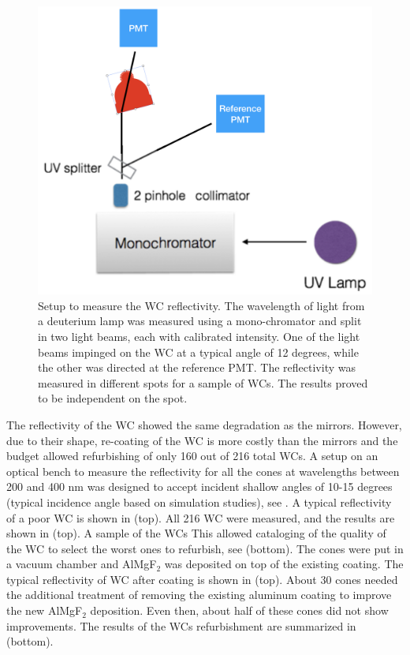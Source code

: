 \begin{figure}
	\centering
	\includegraphics[width=0.95\columnwidth,keepaspectratio]{img/wcSetup.png}
	\caption{Setup to measure the WC reflectivity. The wavelength of light from a deuterium lamp was measured using a mono-chromator and split in two
            light beams, each with calibrated intensity. One of the light beams impinged on the WC at a typical angle of 12 degrees,
            while the other was directed at the reference PMT. The reflectivity was measured in different spots for a sample of WCs.  The results proved
            to be independent on the spot. }
	\label{fig:wcSetup}
\end{figure}

The reflectivity of the WC showed the same degradation as the mirrors. However, due to their shape, re-coating of the WC is more costly than the mirrors and the budget allowed
refurbishing of only 160 out of 216 total WCs.
A setup on an optical bench to measure the reflectivity for all the cones at wavelengths between 200 and 400 nm was designed to accept incident
shallow angles of 10-15 degrees (typical incidence angle based on simulation studies), see . A typical reflectivity of a poor WC is shown in  (top).
All 216 WC were measured, and the results are shown in  (top). A sample of the WCs This allowed cataloging of the quality of the WC to select the worst ones to refurbish,
see  (bottom).
The cones were put in a vacuum chamber and AlMgF$_2$ was deposited on top of the existing coating. The typical reflectivity of WC after coating is shown in  (top).
About 30 cones needed the additional treatment of removing the existing aluminum coating to improve the new AlMgF$_2$ deposition. Even then, about half of these cones did not show improvements.
The results of the WCs refurbishment are summarized in  (bottom).


